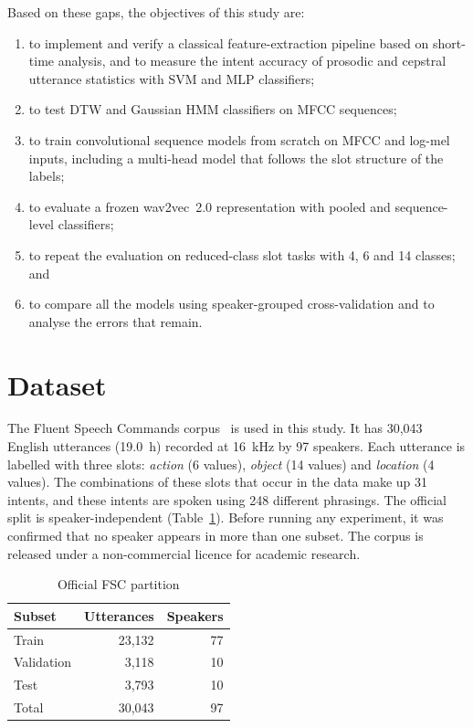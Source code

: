 \documentclass[conference]{IEEEtran}
\begin{document}
Based on these gaps, the objectives of this study are:
\begin{enumerate}
\item to implement and verify a classical feature-extraction pipeline based on short-time analysis, and to measure the intent accuracy of prosodic and cepstral utterance statistics with SVM and MLP classifiers;
\item to test DTW and Gaussian HMM classifiers on MFCC sequences;
\item to train convolutional sequence models from scratch on MFCC and log-mel inputs, including a multi-head model that follows the slot structure of the labels;
\item to evaluate a frozen wav2vec~2.0 representation with pooled and sequence-level classifiers;
\item to repeat the evaluation on reduced-class slot tasks with 4, 6 and 14 classes; and
\item to compare all the models using speaker-grouped cross-validation and to analyse the errors that remain.
\end{enumerate}

\section{Dataset}\label{sec:data}
The Fluent Speech Commands corpus~\cite{lugosch2019fsc} is used in this study. It has 30,043 English utterances (19.0~h) recorded at 16~kHz by 97 speakers. Each utterance is labelled with three slots: \emph{action} (6 values), \emph{object} (14 values) and \emph{location} (4 values). The combinations of these slots that occur in the data make up 31 intents, and these intents are spoken using 248 different phrasings. The official split is speaker-independent (Table~\ref{tab:data}). Before running any experiment, it was confirmed that no speaker appears in more than one subset. The corpus is released under a non-commercial licence for academic research.

\begin{table}[t]
\caption{Official FSC partition}
\label{tab:data}
\centering
\footnotesize
\begin{tabular}{@{}lrr@{}}
\toprule
Subset & Utterances & Speakers\\
\midrule
Train & 23,132 & 77\\
Validation & 3,118 & 10\\
Test & 3,793 & 10\\
\midrule
Total & 30,043 & 97\\
\bottomrule
\end{tabular}
\end{table}
\end{document}
